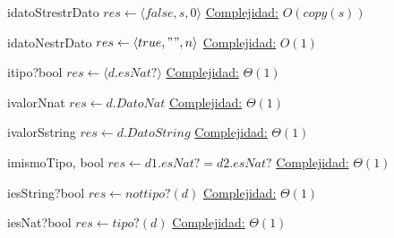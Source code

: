 \begin{Algoritmos}

\begin{algoritmo}{idatoStr}{}{estrDato}
	$res \gets \langle false,s,0 \rangle$ 
    \medskip
	\underline{Complejidad:} $O(copy(s))$
\end{algoritmo}    

\begin{algoritmo}{idatoN}{}{estrDato}
	$res \gets \langle true,"",n \rangle$ 
    \medskip
	\underline{Complejidad:} $O(1)$
\end{algoritmo}    

\begin{algoritmo}{itipo?}{}{bool}
	$res \gets \langle d.esNat? \rangle$ 
    \medskip
	\underline{Complejidad:} $\Theta(1)$
\end{algoritmo}    

\begin{algoritmo}{ivalorN}{}{nat}
	$res \gets d.DatoNat$ 
    \medskip
	\underline{Complejidad:} $\Theta(1)$
\end{algoritmo}    

\begin{algoritmo}{ivalorS}{}{string}
	$res \gets d.DatoString$ 
    \medskip
	\underline{Complejidad:} $\Theta(1)$
\end{algoritmo}    

\begin{algoritmo}{imismoTipo}{, }{bool}
	$res \gets d1.esNat? = d2.esNat?$ 
    \medskip
	\underline{Complejidad:} $\Theta(1)$
\end{algoritmo}    

\begin{algoritmo}{iesString?}{}{bool}
	$res \gets not tipo?(d)$ 
    \medskip
	\underline{Complejidad:} $\Theta(1)$
\end{algoritmo} 

\begin{algoritmo}{iesNat?}{}{bool}
	$res \gets tipo?(d)$ 
    \medskip
	\underline{Complejidad:} $\Theta(1)$
\end{algoritmo} 



\end{Algoritmos}
